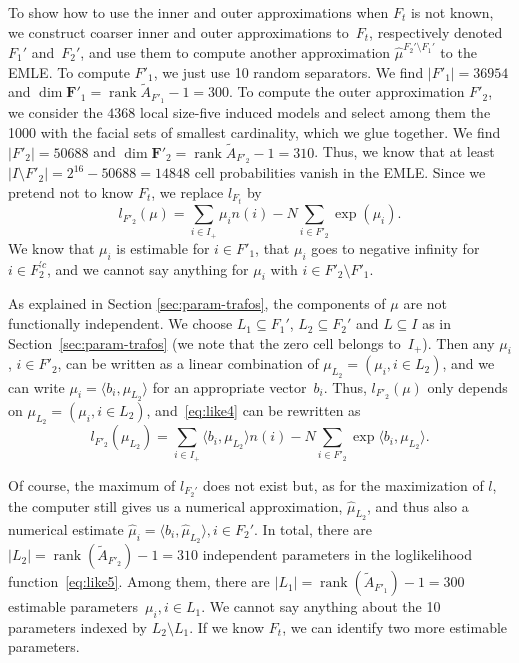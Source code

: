 \documentclass[aos,noinfoline]{imsart}
\DeclareMathOperator{\rank}{rank}
\def\<{\langle}
\def\>{\rangle}
\newcommand{\Fbf}{\mathbf{F}}
\theoremstyle{remark}
\theoremstyle{definition}
\begin{document}
To show how to use the inner and outer approximations when $F_t$ is not known, we construct coarser inner and outer
approximations to~$F_t$, respectively denoted $F_1'$ and~$F_2'$, and use them to compute another approximation
$\hat{\mu}^{F_2'\setminus F_1'}$ to the EMLE.  To compute $F'_1$, we just use 10 random separators.  We find $|F'_1|=\num{36954}$
and $\dim\Fbf'_{1}=\rank\tilde A_{F'_{1}}-1=300$.  To compute the outer approximation $F'_2$, we consider the $4368$ local size-five induced models and select among them the 1000 with the facial sets of smallest cardinality, which we glue together.
We find $|F'_2|=\num{50688}$ and $\dim\Fbf'_{2}=\rank\tilde A_{F'_{2}}-1=310$.  Thus, we know that at least $|I\setminus
F'_2|=2^{16}-\num{50688}=\num{14848}$ cell probabilities vanish in the EMLE. Since we pretend not to know $F_t$,
we replace $l_{F_t}$ by
\begin{equation}
  \label{eq:like4}
  l_{F'_2}(\mu)=\sum_{i \in I_{+}}\mu_i n(i) -N\sum_{i \in F'_2} \exp(\mu_i).
\end{equation}
We know that $\mu_i$ is estimable for $i\in F'_1$, that $\mu_i$ goes to negative infinity for $i\in F_2^{'c}$, and we cannot
say anything for $\mu_i$ with $i\in F'_2 \setminus F'_1$.

As explained in Section \ref{sec:param-trafos}, the components of $\mu$ are not functionally independent.  We choose
$L_{1}\subseteq F_{1}'$, $L_{2}\subseteq F_{2}'$ and $L\subseteq I$ as in Section~\ref{sec:param-trafos} (we note that
the zero cell belongs to~$I_{+}$).
Then any $\mu_{i}$, $i\in F'_{2}$, can be written as a linear combination of $\mu_{L_{2}}=(\mu_{i},i\in L_{2})$, and we
can write $\mu_i=\< b_i, \mu_{L_2}\>$ for an appropriate vector~$b_i$.  Thus, $l_{F'_{2}}(\mu)$ only depends on
$\mu_{L_{2}}=(\mu_{i},i\in L_{2})$, and~\eqref{eq:like4} can be rewritten as
\begin{equation}
  l_{F'_2}(\mu_{L_2})=\sum_{i \in I_{+}}\<b_i,\mu_{L_2}\> n(i) -N\sum_{i \in F'_2} \exp\<b_i,\mu_{L_2}\>.
  \label{eq:like5}
\end{equation}
 
Of course, the maximum of $l_{F_2'}$ does not exist but, as for the maximization of $l$, the computer still gives us a
numerical approximation, $\hat{\mu}_{L_2}$, and thus also a numerical estimate $\hat{\mu}_{i}=\langle
b_i,\hat{\mu}_{L_2}\rangle, i\in F_2'$.
In total, there are $|L_{2}|=\rank(\tilde A_{F'_2})-1=310$
independent parameters in the loglikelihood function~\eqref{eq:like5}.
Among them, there are $|L_{1}|=\rank(\tilde A_{F'_1})-1=300$ estimable parameters~$\mu_{i},i\in L_{1}$.  We cannot say anything
about the 10 parameters indexed by $L_2 \setminus L_1$.  If we know $F_t$, we can identify two more estimable
parameters. %
\end{document}
